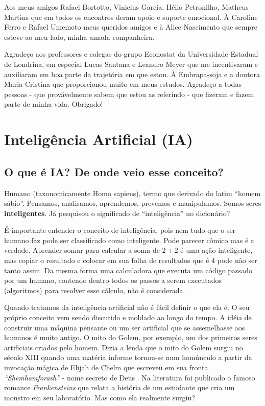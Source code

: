 \documentclass[
  openany]{book}
\begin{document}
Aos meus amigos Rafael Bortotto, Vinicius Garcia, Hélio Petronilho, Matheus Martins que em todos os encontros deram apoio e suporte emocional. À Caroline Ferro e Rafael Umemoto meus queridos amigos e à Alice Nascimento que sempre esteve ao meu lado, minha amada companheira.

Agradeço aos professores e colegas do grupo Econostat da Universidade Estadual de Londrina, em especial Lucas Santana e Leandro Meyer que me incentivaram e auxiliaram em boa parte da trajetória em que estou. À Embrapa-soja e a doutora Maria Cristina que proporcionou muito em meus estudos. Agradeço a todas pessoas - que provávelmente sabem que estou as referindo - que fizeram e fazem parte de minha vida. Obrigado!

\hypertarget{i-a}{%
\chapter{Inteligência Artificial (IA)}\label{i-a}}

\hypertarget{o-que-uxe9-ia-de-onde-veio-esse-conceito}{%
\section{O que é IA? De onde veio esse conceito?}\label{o-que-uxe9-ia-de-onde-veio-esse-conceito}}

Humano (taxonomicamente Homo sapiens), termo que derivado do latim ``homem sábio''. Pensamos, analisamos, aprendemos, prevemos e manipulamos. Somos seres \textbf{inteligentes}. Já pesquisou o significado de ``inteligência'' no dicionário?

É importante entender o conceito de inteligência, pois nem tudo que o ser humano faz pode ser classificado como inteligente. Pode parecer cômico mas é a verdade. Aprender somar para calcular a soma de \(2+2\) é uma ação inteligente, mas copiar o resultado e colocar em sua folha de resultados que é 4 pode não ser tanto assim. Da mesma forma uma calculadora que executa um código passado por um humano, contendo dentro todos os passos a serem executados (algoritmos) para resolver esse cálculo, não é considerada.

Quando tratamos da inteligência artificial não é fácil definir o que ela é. O seu próprio conceito vem sendo discutido e moldado ao longo do tempo. A idéia de construir uma máquina pensante ou um ser artificial que se assemelhasse aos humanos é muito antigo. O mito do Golem, por exemplo, um dos primeiros seres artificiais criados pelo homem. Dizia a lenda que o mito do Golem surgiu no século XIII quando uma matéria informe tornou-se num homúnculo a partir da invocação mágica de Elijah de Chelm que escreveu em sua fronta \emph{``Shemhamforash''} - nome secreto de Deus \citep{moser2006golem}. Na literatura foi publicado o famoso romance \emph{Frankensteins} \citep{shelley1818frankenstein} que relata a história de um estudante que cria um monstro em seu laboratório. Mas como ela realmente surgiu?
\end{document}
